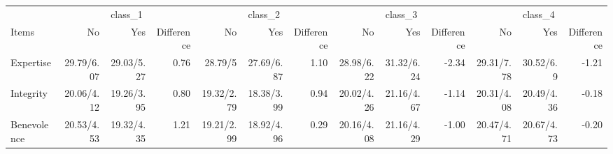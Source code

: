 \begin{longtable}{l|rrrrrrrrrrrr}
\toprule
\multicolumn{1}{l}{} & \multicolumn{3}{c}{class\_1} & \multicolumn{3}{c}{class\_2} & \multicolumn{3}{c}{class\_3} & \multicolumn{3}{c}{class\_4} \\ 
\cmidrule(lr){2-4} \cmidrule(lr){5-7} \cmidrule(lr){8-10} \cmidrule(lr){11-13}
\multicolumn{1}{l}{Items} & No & Yes & Difference & No & Yes & Difference & No & Yes & Difference & No & Yes & Difference \\ 
\midrule\addlinespace[2.5pt]
Expertise & 29.79/6.07 & 29.03/5.27 & 0.76 & 28.79/5 & 27.69/6.87 & 1.10 & 28.98/6.22 & 31.32/6.24 & -2.34 & 29.31/7.78 & 30.52/6.9 & -1.21 \\ 
Integrity & 20.06/4.12 & 19.26/3.95 & 0.80 & 19.32/2.79 & 18.38/3.99 & 0.94 & 20.02/4.26 & 21.16/4.67 & -1.14 & 20.31/4.08 & 20.49/4.36 & -0.18 \\ 
Benevolence & 20.53/4.53 & 19.32/4.35 & 1.21 & 19.21/2.99 & 18.92/4.96 & 0.29 & 20.16/4.08 & 21.16/4.29 & -1.00 & 20.47/4.71 & 20.67/4.73 & -0.20 \\ 
\bottomrule
\end{longtable}

